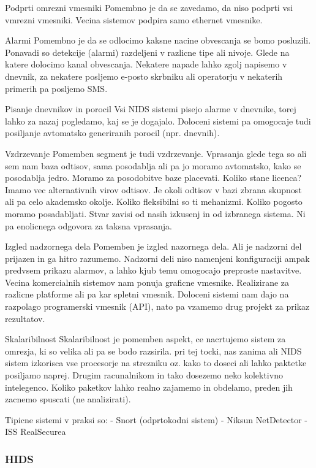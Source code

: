 \documentclass[12pt]{article}
\begin{document}
Podprti omrezni vmesniki
Pomembno je da se zavedamo, da niso podprti vsi vmrezni vmesniki. Vecina sistemov podpira samo ethernet vmesnike.

Alarmi
Pomembno je da se odlocimo kaksne nacine obvescanja se bomo posluzili. Ponavadi so detekcije (alarmi) razdeljeni v razlicne tipe ali nivoje.
Glede na katere dolocimo kanal obvescanja. 
Nekatere napade lahko zgolj napisemo v dnevnik, za nekatere posljemo e-posto skrbniku ali operatorju v nekaterih primerih pa posljemo SMS.

Pisanje dnevnikov in porocil
Vsi NIDS sistemi pisejo alarme v dnevnike, torej lahko za nazaj pogledamo, kaj se je dogajalo. Doloceni sistemi pa omogocaje tudi posiljanje avtomatsko generiranih porocil (npr. dnevnih).

Vzdrzevanje
Pomemben segment je tudi vzdrzevanje. Vprasanja glede tega so ali sem nam baza odtisov, sama posodablja ali pa jo moramo avtomatsko, kako se posodablja jedro. Moramo za posodobitve baze placevati. Koliko stane licenca?
Imamo vec alternativnih virov odtisov. Je okoli odtisov v bazi zbrana skupnost ali pa celo akademsko okolje.
Koliko fleksibilni so ti mehanizmi. Koliko pogosto moramo posadabljati. 
Stvar zavisi od nasih izkusenj in od izbranega sistema. Ni pa enolicnega odgovora za taksna vprasanja.

Izgled nadzornega dela
Pomemben je izgled nazornega dela. Ali je nadzorni del prijazen in ga hitro razumemo.
Nadzorni deli niso namenjeni konfiguraciji ampak predvsem prikazu alarmov, a lahko kjub temu omogocajo preproste nastavitve.
Vecina komercialnih sistemov nam ponuja graficne vmesnike. Realizirane za razlicne platforme ali pa kar spletni vmesnik.
Doloceni sistemi nam dajo na razpolago programerski vmesnik (API), nato pa vzamemo drug projekt za prikaz rezultatov.

Skalaribilnost
Skalaribilnost je pomemben aspekt, ce nacrtujemo sistem za omrezja, ki so velika ali pa se bodo razsirila. 
pri tej tocki, nas zanima ali NIDS sistem izkorisca vse procesorje na strezniku oz. kako to doseci ali lahko paktetke posiljamo naprej. Drugim racunalnikom in tako dosezemo neko kolektivno intelegenco.
Koliko paketkov lahko realno zajamemo in obdelamo, preden jih zacnemo spuscati (ne analizirati).



Tipicne sistemi v praksi so:
- Snort (odprtokodni sistem)
- Niksun NetDetector
- ISS RealSecurea

\subsubsection{HIDS}
\end{document}
